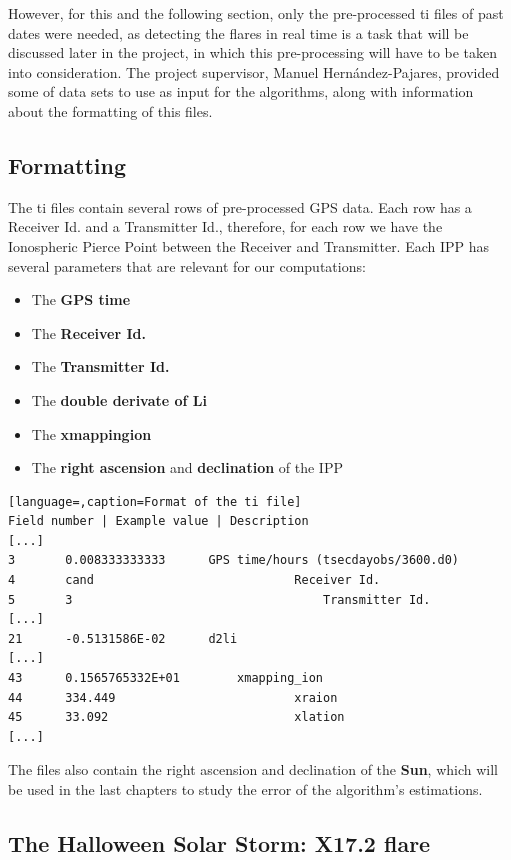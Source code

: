 However, for this and the following section, only the pre-processed ti files of past dates were needed, as detecting the flares in real time is a task that will be discussed later in the project, in which this pre-processing will have to be taken into consideration. The project supervisor, Manuel Hernández-Pajares, provided some of data sets to use as input for the algorithms, along with information about the formatting of this files.

\subsection{Formatting}

The ti files contain several rows of pre-processed GPS data. Each row has a Receiver Id. and a Transmitter Id., therefore, for each row we have the Ionospheric Pierce Point between the Receiver and Transmitter. Each IPP has several parameters that are relevant for our computations:

\begin{itemize}
\item The \textbf{GPS time}
\item The \textbf{Receiver Id.}
\item The \textbf{Transmitter Id.}
\item The \textbf{double derivate of Li}
\item The \textbf{xmappingion}
\item The \textbf{right ascension} and \textbf{declination} of the IPP
\end{itemize}

\begin{minipage}{\linewidth}
\begin{lstlisting}[language=,caption=Format of the ti file]
Field number | Example value | Description
[...]
3 		0.008333333333		GPS time/hours (tsecdayobs/3600.d0)
4 		cand							Receiver Id.
5 		3									Transmitter Id.
[...]
21 		-0.5131586E-02		d2li
[...]
43 		0.1565765332E+01		xmapping_ion
44 		334.449							xraion
45 		33.092							xlation
[...]
\end{lstlisting}
\end{minipage}
The files also contain the right ascension and declination of the \textbf{Sun}, which will be used in the last chapters to study the error of the algorithm's estimations.

\subsection{The Halloween Solar Storm: X17.2 flare}

